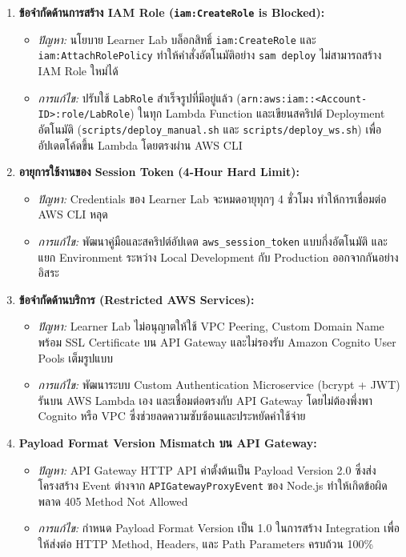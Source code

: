 \documentclass[12pt,a4paper]{report}
\begin{document}
\begin{enumerate}
    \item \textbf{ข้อจำกัดด้านการสร้าง IAM Role (\texttt{iam:CreateRole} is Blocked):}
    \begin{itemize}
        \item \textit{ปัญหา:} นโยบาย Learner Lab บล็อกสิทธิ์ \texttt{iam:CreateRole} และ \texttt{iam:AttachRolePolicy} ทำให้คำสั่งอัตโนมัติอย่าง \texttt{sam deploy} ไม่สามารถสร้าง IAM Role ใหม่ได้
        \item \textit{การแก้ไข:} ปรับใช้ \texttt{LabRole} สำเร็จรูปที่มีอยู่แล้ว (\texttt{arn:aws:iam::<Account-ID>:role/LabRole}) ในทุก Lambda Function และเขียนสคริปต์ Deployment อัตโนมัติ (\texttt{scripts/deploy\_manual.sh} และ \texttt{scripts/deploy\_ws.sh}) เพื่ออัปเดตโค้ดขึ้น Lambda โดยตรงผ่าน AWS CLI
    \end{itemize}
    
    \item \textbf{อายุการใช้งานของ Session Token (4-Hour Hard Limit):}
    \begin{itemize}
        \item \textit{ปัญหา:} Credentials ของ Learner Lab จะหมดอายุทุกๆ 4 ชั่วโมง ทำให้การเชื่อมต่อ AWS CLI หลุด
        \item \textit{การแก้ไข:} พัฒนาคู่มือและสคริปต์อัปเดต \texttt{aws\_session\_token} แบบกึ่งอัตโนมัติ และแยก Environment ระหว่าง Local Development กับ Production ออกจากกันอย่างอิสระ
    \end{itemize}
    
    \item \textbf{ข้อจำกัดด้านบริการ (Restricted AWS Services):}
    \begin{itemize}
        \item \textit{ปัญหา:} Learner Lab ไม่อนุญาตให้ใช้ VPC Peering, Custom Domain Name พร้อม SSL Certificate บน API Gateway และไม่รองรับ Amazon Cognito User Pools เต็มรูปแบบ
        \item \textit{การแก้ไข:} พัฒนาระบบ Custom Authentication Microservice (bcrypt + JWT) รันบน AWS Lambda เอง และเชื่อมต่อตรงกับ API Gateway โดยไม่ต้องพึ่งพา Cognito หรือ VPC ซึ่งช่วยลดความซับซ้อนและประหยัดค่าใช้จ่าย
    \end{itemize}
    
    \item \textbf{Payload Format Version Mismatch บน API Gateway:}
    \begin{itemize}
        \item \textit{ปัญหา:} API Gateway HTTP API ค่าตั้งต้นเป็น Payload Version 2.0 ซึ่งส่งโครงสร้าง Event ต่างจาก \texttt{APIGatewayProxyEvent} ของ Node.js ทำให้เกิดข้อผิดพลาด 405 Method Not Allowed
        \item \textit{การแก้ไข:} กำหนด Payload Format Version เป็น 1.0 ในการสร้าง Integration เพื่อให้ส่งต่อ HTTP Method, Headers, และ Path Parameters ครบถ้วน 100\%
    \end{itemize}
\end{enumerate}
\end{document}
